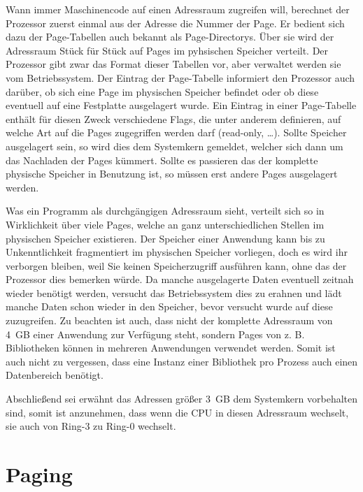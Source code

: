 \documentclass[12pt]{book}
\begin{document}
Wann immer Maschinencode auf einen Adressraum zugreifen will, berechnet der
Prozessor zuerst einmal aus der Adresse die Nummer der Page. Er bedient sich dazu
der Page-Tabellen auch bekannt als Page-Directorys. Über sie wird der
Adressraum Stück für Stück auf Pages im pyhsischen Speicher verteilt. Der
Prozessor gibt zwar das Format dieser Tabellen vor, aber verwaltet werden sie
vom Betriebssystem. Der Eintrag der Page-Tabelle informiert den Prozessor auch
darüber, ob sich eine Page im physischen Speicher befindet oder ob diese
eventuell auf eine Festplatte ausgelagert wurde. Ein Eintrag in einer
Page-Tabelle enthält für diesen Zweck verschiedene Flags, die unter anderem
definieren, auf welche Art auf die Pages zugegriffen werden darf (read-only, …).
Sollte Speicher ausgelagert sein, so wird dies dem Systemkern gemeldet, welcher
sich dann um das Nachladen der Pages kümmert. Sollte es passieren das der
komplette physische Speicher in Benutzung ist, so müssen erst andere Pages
ausgelagert werden.

Was ein Programm als durchgängigen Adressraum sieht, verteilt sich so in
Wirklichkeit über viele Pages, welche an ganz unterschiedlichen Stellen im
physischen Speicher existieren. Der Speicher einer Anwendung kann bis zu
Unkenntlichkeit fragmentiert im physischen Speicher vorliegen, doch es wird ihr
verborgen bleiben, weil Sie keinen Speicherzugriff ausführen kann, ohne das der
Prozessor dies bemerken würde. Da manche ausgelagerte Daten eventuell zeitnah
wieder benötigt werden, versucht das Betriebssystem dies zu erahnen und lädt
manche Daten schon wieder in den Speicher, bevor versucht wurde auf diese
zuzugreifen. Zu beachten ist auch, dass nicht der komplette Adressraum von 4 GB
einer Anwendung zur Verfügung steht, sondern Pages von z. B. Bibliotheken
können in mehreren Anwendungen verwendet werden. Somit ist auch nicht zu
vergessen, dass eine Instanz einer Bibliothek pro Prozess auch einen
Datenbereich benötigt.

Abschließend sei erwähnt das Adressen größer 3 GB dem Systemkern vorbehalten
sind, somit ist anzunehmen, dass wenn die CPU in diesen Adressraum wechselt, sie
auch von Ring-3 zu Ring-0 wechselt.

\section{Paging}
\end{document}
